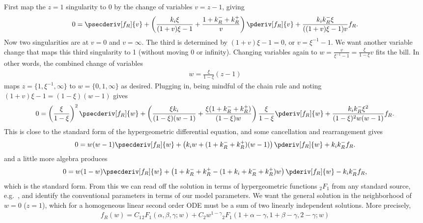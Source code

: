 First map the $z=1$ singularity to 0 by the change of variables $v=z-1$, giving
\begin{align}
0 = \psecderiv[f_R]{v}
        + \left(\frac{k_i\xi}{(1+v)\xi - 1}
                + \frac{1 + k_R^- + k_R^+}{v}
        \right)\pderiv[f_R]{v}
        + \frac{k_i k_R^- \xi}{((1+v)\xi - 1)v}f_R.
\end{align}
Now two singularities are at $v=0$ and $v=\infty$.
The third is determined by $(1+v)\xi -1 = 0$, or $v=\xi^{-1} - 1$.
We want another variable change that maps this third singularity to 1
(without moving 0 or infinity). Changing variables again to
$w=\frac{v}{\xi^{-1} - 1} = \frac{\xi}{1-\xi} v$ fits the bill.
In other words, the combined change of variables
\begin{align}
w = \frac{\xi}{1-\xi} (z-1)
\end{align}
maps $z = \{1, \xi^{-1}, \infty\}$ to $w =\{0, 1, \infty\}$ as desired.
Plugging in, being mindful of the chain rule and noting
$(1 + v)\xi - 1 = (1 - \xi)(w - 1)$ gives
\begin{align}
0 = \left(\frac{\xi}{1-\xi}\right)^2 \psecderiv[f_R]{w}
+ \left(
        \frac{\xi k_i}{(1-\xi)(w-1)} + \frac{\xi(1 + k_R^- + k_R^+)}{(1-\xi)w}
\right) \frac{\xi}{1-\xi} \pderiv[f_R]{w}
+ \frac{k_i k_R^- \xi^2}{(1-\xi)^2 w(w-1)}f_R.
\end{align}
This is close to the standard form of the hypergeometric differential
equation, and some cancellation and rearrangement gives
\begin{align}
0 = w(w-1)\psecderiv[f_R]{w}
+ \left(k_i w + (1 + k_R^- + k_R^+)(w-1)\right) \pderiv[f_R]{w}
+ k_i k_R^- f_R.
\end{align}
and a little more algebra produces
\begin{align}
0 = w(1-w)\psecderiv[f_R]{w}
+ \left(1 + k_R^- + k_R^+
        - (1 + k_i + k_R^- + k_R^+)w
\right) \pderiv[f_R]{w}
- k_i k_R^- f_R,
\end{align}
which is the standard form. From this we can read off the solution
in terms of hypergeometric functions ${_2F_1}$ from
any standard source, e.g.~\cite{Abramowitz1964}, and identify the
conventional parameters in terms of our model parameters.
We want the general solution in the neighborhood of $w=0$ ($z=1$),
which for a homogeneous linear second order ODE must be a sum of two
linearly independent solutions.
More precisely,
\begin{align}
f_R(w) = C_1 {_2F_1}(\alpha, \beta, \gamma; w)
+ C_2 w^{1-\gamma}{_2F_1}(1+\alpha-\gamma, 1+\beta-\gamma, 2-\gamma; w)
\end{align}
